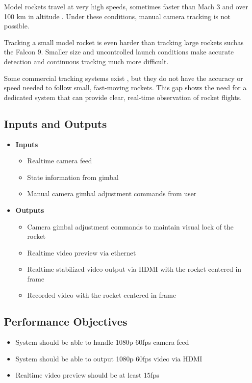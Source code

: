 \documentclass{article}
\begin{document}
Model rockets travel at very high speeds, sometimes faster than Mach 3 and over
100 km in altitude \citep{SpaceConcordiaRocketry2025}. Under these conditions,
manual camera tracking is not possible.

Tracking a small model rocket is even harder than tracking large rockets suchas
the Falcon 9. Smaller size and uncontrolled launch conditions make accurate
detection and continuous tracking much more difficult.

Some commercial tracking systems exist \citep{AverTR3XX2021}, but they do not
have the accuracy or speed needed to follow small, fast-moving rockets. This
gap shows the need for a dedicated system that can provide clear, real-time
observation of rocket flights.

\subsection{Inputs and Outputs}
\begin{itemize}
    \item \textbf{Inputs}
          \begin{itemize}
              \item Realtime camera feed
              \item State information from gimbal
              \item Manual camera gimbal adjustment commands from user
          \end{itemize}

    \item \textbf{Outputs}
          \begin{itemize}
              \item Camera gimbal adjustment commands to maintain visual lock of the rocket
              \item Realtime video preview via ethernet
              \item Realtime stabilized video output via HDMI with the rocket centered in frame
              \item Recorded video with the rocket centered in frame
          \end{itemize}
\end{itemize}

\subsection{Performance Objectives}
\label{sec:performance}

\begin{itemize}
    \item System should be able to handle 1080p 60fps camera feed
    \item System should be able to output 1080p 60fps video via HDMI
    \item Realtime video preview should be at least 15fps
\end{itemize}
\end{document}
